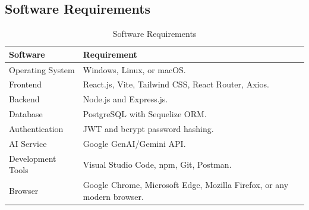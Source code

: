 \subsection{Software Requirements}
\begin{table}[h]
\centering
\caption{Software Requirements}
\begin{tabularx}{\textwidth}{|p{4cm}|X|}
\hline
\textbf{Software} & \textbf{Requirement} \\
\hline
Operating System & Windows, Linux, or macOS. \\
\hline
Frontend & React.js, Vite, Tailwind CSS, React Router, Axios. \\
\hline
Backend & Node.js and Express.js. \\
\hline
Database & PostgreSQL with Sequelize ORM. \\
\hline
Authentication & JWT and bcrypt password hashing. \\
\hline
AI Service & Google GenAI/Gemini API. \\
\hline
Development Tools & Visual Studio Code, npm, Git, Postman. \\
\hline
Browser & Google Chrome, Microsoft Edge, Mozilla Firefox, or any modern browser. \\
\hline
\end{tabularx}
\end{table}

\FloatBarrier
